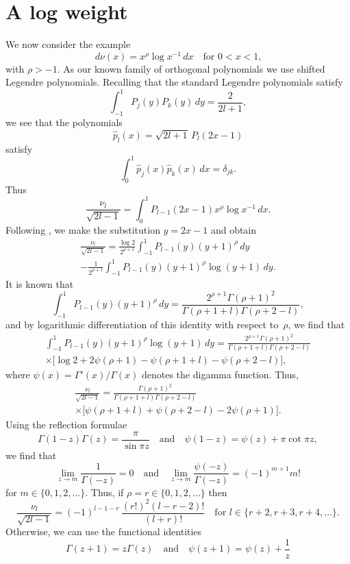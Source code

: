 \documentclass[12pt,a4paper]{article}
\begin{document}
\section{A log weight}
We now consider the example
\[
d\nu(x)=x^\rho\log x^{-1}\,dx\quad\text{for $0<x<1$,}
\]
with $\rho>-1$.  As our known family of orthogonal polynomials we 
use shifted Legendre polynomials.  Recalling that the standard 
Legendre polynomials satisfy
\[
\int_{-1}^1P_j(y)P_k(y)\,dy=\frac{2}{2l+1},
\]
we see that the polynomials
\[
\hat p_l(x)=\sqrt{2l+1}\,P_l(2x-1)
\]
satisfy
\[
\int_0^1\hat p_j(x)\hat p_k(x)\,dx=\delta_{jk}.
\]
Thus
\[
\frac{\nu_l}{\sqrt{2l-1}}=\int_0^1 P_{l-1}(2x-1)x^\rho\log x^{-1}\,dx.
\]
Following \cite{Gautschi1979}, we make the substitution $y=2x-1$
and obtain
\begin{multline*}
\frac{\nu_l}{\sqrt{2l-1}}=\frac{\log 2}{2^{\rho+1}}\int_{-1}^1 
	P_{l-1}(y)(y+1)^\rho\,dy\\
	-\frac{1}{2^{\rho+1}}\int_{-1}^1 
		P_{l-1}(y)(y+1)^\rho\log(y+1)\,dy.
\end{multline*}
It is known that
\[
\int_{-1}^1 P_{l-1}(y)(y+1)^\rho\,dy
	=\frac{2^{\rho+1}\Gamma(\rho+1)^2}%
{\Gamma(\rho+1+l)\Gamma(\rho+2-l)},
\]
and by logarithmic differentiation of this identity with respect 
to~$\rho$, we find that
\begin{multline*}
\int_{-1}^1 P_{l-1}(y)(y+1)^\rho\log(y+1)\,dy
	=\frac{2^{\rho+1}\Gamma(\rho+1)^2}%
{\Gamma(\rho+1+l)\Gamma(\rho+2-l)}\\
	\times\bigl[\log2+2\psi(\rho+1)-\psi(\rho+1+l)-\psi(\rho+2-l)
	\bigr],
\end{multline*}
where $\psi(x)=\Gamma'(x)/\Gamma(x)$ denotes the digamma function.
Thus,
\begin{multline}\label{eq: mu l}
\frac{\nu_l}{\sqrt{2l-1}}
	=\frac{\Gamma(\rho+1)^2}{\Gamma(\rho+1+l)\Gamma(\rho+2-l)} \\
	\times\bigl[\psi(\rho+1+l)+\psi(\rho+2-l)-2\psi(\rho+1)\bigr].
\end{multline}
Using the reflection formulae
\[
\Gamma(1-z)\Gamma(z)=\frac{\pi}{\sin\pi z}
\quad\text{and}\quad
\psi(1-z)=\psi(z)+\pi\cot\pi z,
\]
we find that
\[
\lim_{z\to m}\frac{1}{\Gamma(-z)}=0
\quad\text{and}\quad
\lim_{z\to m}\frac{\psi(-z)}{\Gamma(-z)}=(-1)^{m+1}m!
\]
for $m\in\{0,1,2,\dots\}$.  Thus, if $\rho=r\in\{0,1,2,\dots\}$
then
\[
\frac{\nu_l}{\sqrt{2l-1}}=(-1)^{l-1-r}\,\frac{(r!)^2(l-r-2)!}{(l+r)!}
	\quad\text{for $l\in\{r+2, r+3, r+4, \dots\}$.}
\]
Otherwise, we can use the functional identities
\[
\Gamma(z+1)=z\Gamma(z)\quad\text{and}\quad
\psi(z+1)=\psi(z)+\frac{1}{z}
\]
\end{document}
